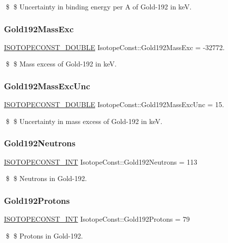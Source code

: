 \$ \$ Uncertainty in binding energy per A of Gold-\/192 in keV. \mbox{\label{group___isotope_const-_gold-_au192_gac434cf6b7e641cd2578a258b30f99ae1}} 
\subsubsection{\texorpdfstring{Gold192\+Mass\+Exc}{Gold192MassExc}}
{\footnotesize\ttfamily \mbox{\hyperlink{group___isotope_const-_macros_ga8f45a7272ce02c0b4c65c44636ed719a}{I\+S\+O\+T\+O\+P\+E\+C\+O\+N\+S\+T\+\_\+\+D\+O\+U\+B\+LE}} Isotope\+Const\+::\+Gold192\+Mass\+Exc = -\/32772.}

\$ \$ Mass excess of Gold-\/192 in keV. \mbox{\label{group___isotope_const-_gold-_au192_gac4e269b800e9a0c98aeb37fd1d95f07f}} 
\subsubsection{\texorpdfstring{Gold192\+Mass\+Exc\+Unc}{Gold192MassExcUnc}}
{\footnotesize\ttfamily \mbox{\hyperlink{group___isotope_const-_macros_ga8f45a7272ce02c0b4c65c44636ed719a}{I\+S\+O\+T\+O\+P\+E\+C\+O\+N\+S\+T\+\_\+\+D\+O\+U\+B\+LE}} Isotope\+Const\+::\+Gold192\+Mass\+Exc\+Unc = 15.}

\$ \$ Uncertainty in mass excess of Gold-\/192 in keV. \mbox{\label{group___isotope_const-_gold-_au192_gac7d13b35cbe74e1ca7ebfd414c8b6a7d}} 
\subsubsection{\texorpdfstring{Gold192\+Neutrons}{Gold192Neutrons}}
{\footnotesize\ttfamily \mbox{\hyperlink{group___isotope_const-_macros_ga5f18360b3e99483a35c32d789e62621c}{I\+S\+O\+T\+O\+P\+E\+C\+O\+N\+S\+T\+\_\+\+I\+NT}} Isotope\+Const\+::\+Gold192\+Neutrons = 113}

\$ \$ Neutrons in Gold-\/192. \mbox{\label{group___isotope_const-_gold-_au192_ga63263bf4079168f850ef614d5a8b2be6}} 
\subsubsection{\texorpdfstring{Gold192\+Protons}{Gold192Protons}}
{\footnotesize\ttfamily \mbox{\hyperlink{group___isotope_const-_macros_ga5f18360b3e99483a35c32d789e62621c}{I\+S\+O\+T\+O\+P\+E\+C\+O\+N\+S\+T\+\_\+\+I\+NT}} Isotope\+Const\+::\+Gold192\+Protons = 79}

\$ \$ Protons in Gold-\/192. 